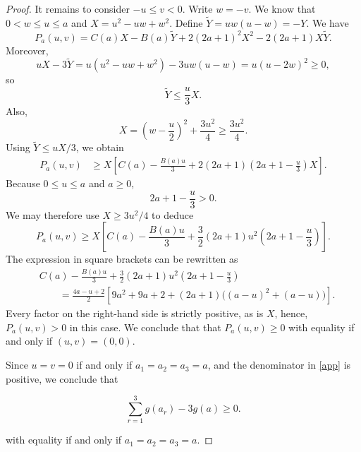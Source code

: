\documentclass{article}
\begin{document}
\begin{proof}
It remains to consider $-u\leq v<0$.  Write $w=-v$.  We know that $0<w\leq u\leq a$ and $
X=u^2-uw+w^2$. Define $\tilde{Y}=uw(u-w)=-Y$. We have
\[
P_a(u,v)
=C(a)X-B(a)\tilde{Y}+2(2a+1)^2X^2-2(2a+1)X\tilde{Y}.
\]
Moreover,
\[
uX-3\tilde{Y}
=u(u^2-uw+w^2)-3uw(u-w)
=u(u-2w)^2\geq0,
\]
so
\[
\tilde{Y}\leq \frac{u}{3}X.
\]
Also,
\[
X=\left(w-\frac{u}{2}\right)^2+\frac{3u^2}{4}
\geq\frac{3u^2}{4}.
\]
Using $\tilde{Y}\leq uX/3$, we obtain
\[
\begin{aligned}
P_a(u,v)
&\geq X\left[
C(a)-\frac{B(a)u}{3}
+2(2a+1)\left(2a+1-\frac{u}{3}\right)X
\right].
\end{aligned}
\]
Because $0\leq u\leq a$ and $a\geq0$,
\[
2a+1-\frac{u}{3}>0.
\]
We may therefore use $X\geq3u^2/4$ to deduce
\[
P_a(u,v)\geq X\left[
C(a)-\frac{B(a)u}{3}
+\frac{3}{2}(2a+1)u^2
 \left(2a+1-\frac{u}{3}\right)
\right].
\]
The expression in square brackets can be rewritten as
\[
\begin{aligned}
&C(a)-\frac{B(a)u}{3}
+\frac{3}{2}(2a+1)u^2
 \left(2a+1-\frac{u}{3}\right)\\
&\qquad=
\frac{4a-u+2}{2}
\left[
9a^2+9a+2
+(2a+1)\bigl((a-u)^2+(a-u)\bigr)
\right].
\end{aligned}
\]
Every factor on the right-hand side is strictly positive, as is $X$, hence, $P_a(u,v)>0$ in this case. We conclude that that $P_a(u,v)\geq0$ with equality if and only if $(u,v)=(0,0)$. 


Since $u=v=0$ if and only if $a_1=a_2=a_3=a$, and the denominator in \eqref{app} is positive, we conclude that

\[
\sum_{r=1}^3 g(a_r)- 3g(a)\geq 0.
\]

with equality if and only if $a_1=a_2=a_3=a.$

\end{proof}
\end{document}
